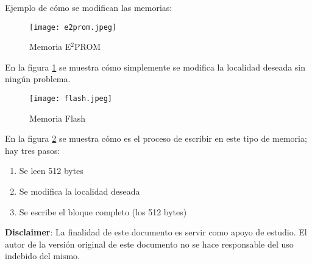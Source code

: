 \documentclass{article}
\begin{document}
\vspace{1em}
Ejemplo de cómo se modifican las memorias:

\begin{figure}[h!]
	\texttt{[image: e2prom.jpeg]}
	\caption{Memoria E$^2$PROM}
	\label{fig:e2prom}
\end{figure}

En la figura \ref{fig:e2prom} se muestra cómo simplemente se modifica la localidad
deseada sin ningún problema.

\begin{figure}[h!]
	\texttt{[image: flash.jpeg]}
	\caption{Memoria Flash}
	\label{fig:Flash}
\end{figure}

\newpage

En la figura \ref{fig:Flash} se muestra cómo es el proceso de escribir en este
tipo de memoria; hay tres pasos:

\begin{enumerate}
	\item
		Se leen 512 bytes
	\item
	Se modifica la localidad deseada
	\item
		Se escribe el bloque completo (los 512 bytes)
\end{enumerate}

\vspace{1em}
\textbf{Disclaimer}: La finalidad de este documento es servir como apoyo de estudio.
El autor de la versión original de este documento no se hace responsable del
uso indebido del mismo.
\end{document}
